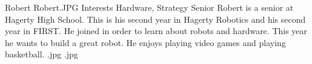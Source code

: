 {Robert}
{Robert.JPG}
{Interests}
{Hardware, Strategy}
{Senior}
{
Robert is a senior at Hagerty High School. This is his second year in Hagerty Robotics and his second year in FIRST. He joined in order to learn about robots and hardware. This year he wants to build a great robot. He enjoys playing video games and playing basketball.
}
{.jpg}
{.jpg}
